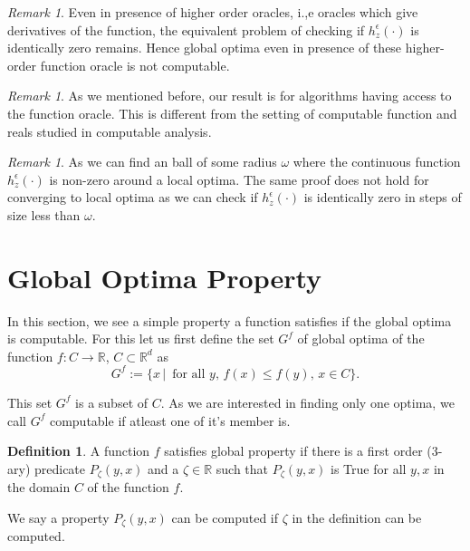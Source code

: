 \documentclass[a4paper,11pt]{article}
\theoremstyle{definition}
\newtheorem{definition}[theorem]{Definition}
\theoremstyle{remark}
\newtheorem{remark}[theorem]{Remark}
\begin{document}
	\begin{remark}
		Even in presence of higher order oracles, i.,e oracles which give derivatives of the function, the equivalent problem of checking if $h_z^{\epsilon}(\cdot)$ is identically zero remains. Hence global optima even in presence of these higher-order function oracle is not computable. %
	\end{remark}
	
	\begin{remark}
		As we mentioned before, our result is for algorithms having access to the function oracle. This is different from the setting of computable function and reals studied in computable analysis. \cite{pour}
	\end{remark}
	
	\begin{remark}
		As we can find an ball of some radius $\omega$ where the continuous function $h_z^{\epsilon}(\cdot)$ is non-zero around a local optima. The same proof does not hold for converging to local optima as we can check if $h_z^{\epsilon}(\cdot)$ is identically zero in steps of size less than $\omega$.
	\end{remark}
	
	\section{Global Optima Property}
	In this section, we see a simple property a function satisfies if the global optima is computable. For this let us first define the set $G^f$ of global optima of the function $f:C\rightarrow \mathbb{R}$, $C\subset \mathbb{R}^d$ as
	\[ G^f := \{x\,| \, \mbox{ for all } y, \, f(x) \leq f(y), \, x \in C \}.\]
	
	This set $G^f$ is a subset of $C$. As we are interested in finding only one optima, we call $G^f$ computable if atleast one of it's member is. %
	
	\begin{definition}
		A function $f$ satisfies global property if there is a first order (3-ary) predicate $P_{\zeta}(y,x)$ and a $\zeta \in \mathbb{R}$ such that $P_{\zeta}(y,x)$ is True for all $y,x$ in the domain $C$ of the function $f$.
	\end{definition}
	
	We say a property $P_{\zeta}(y,x)$ can be computed if $\zeta$ in the definition can be computed.
	
\end{document}

